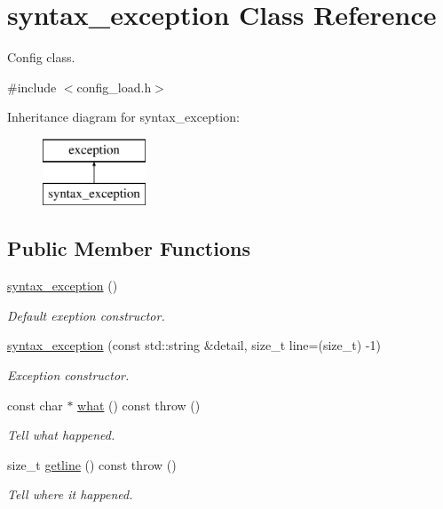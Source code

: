 \hypertarget{classsyntax__exception}{}\section{syntax\+\_\+exception Class Reference}
\label{classsyntax__exception}


Config class.  




{\ttfamily \#include $<$config\+\_\+load.\+h$>$}

Inheritance diagram for syntax\+\_\+exception\+:\begin{figure}[H]
\begin{center}
\leavevmode
\includegraphics[height=2.000000cm]{classsyntax__exception}
\end{center}
\end{figure}
\subsection*{Public Member Functions}
\begin{DoxyCompactItemize}
\item 
\hyperlink{classsyntax__exception_a60278cf3cd3eba72c35f27ee36a21d68}{syntax\+\_\+exception} ()
\begin{DoxyCompactList}\small\item\em Default exeption constructor. \end{DoxyCompactList}\item 
\hyperlink{classsyntax__exception_aff5164bb18c155255820187afa2215c9}{syntax\+\_\+exception} (const std\+::string \&detail, size\+\_\+t line=(size\+\_\+t) -\/1)
\begin{DoxyCompactList}\small\item\em Exception constructor. \end{DoxyCompactList}\item 
const char $\ast$ \hyperlink{classsyntax__exception_a2a32f5e0c2acbbf37c10c9aa3d72506c}{what} () const  throw ()
\begin{DoxyCompactList}\small\item\em Tell what happened. \end{DoxyCompactList}\item 
size\+\_\+t \hyperlink{classsyntax__exception_aa25100b3e6601bb67aa5a5d1e76f508e}{getline} () const  throw ()
\begin{DoxyCompactList}\small\item\em Tell where it happened. \end{DoxyCompactList}\end{DoxyCompactItemize}


